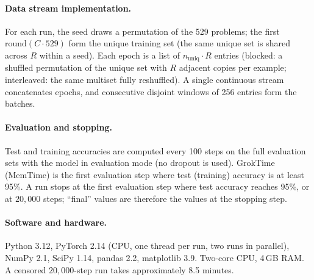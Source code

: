 \documentclass[10pt]{article}
\newcommand{\coverage}{C}
\newcommand{\groktime}{GrokTime}
\newcommand{\memtime}{MemTime}
\begin{document}
\paragraph{Data stream implementation.}
For each run, the seed draws a permutation of the 529 problems; the first $\mathrm{round}(\coverage \cdot 529)$ form the unique training set (the same unique set is shared across $R$ within a seed). Each epoch is a list of $n_{\mathrm{uniq}} \cdot R$ entries (blocked: a shuffled permutation of the unique set with $R$ adjacent copies per example; interleaved: the same multiset fully reshuffled). A single continuous stream concatenates epochs, and consecutive disjoint windows of 256 entries form the batches.

\paragraph{Evaluation and stopping.}
Test and training accuracies are computed every 100 steps on the full evaluation sets with the model in evaluation mode (no dropout is used). \groktime{} (\memtime{}) is the first evaluation step where test (training) accuracy is at least 95\%. A run stops at the first evaluation step where test accuracy reaches 95\%, or at $20{,}000$ steps; ``final'' values are therefore the values at the stopping step.

\paragraph{Software and hardware.}
Python 3.12, PyTorch 2.14 (CPU, one thread per run, two runs in parallel), NumPy 2.1, SciPy 1.14, pandas 2.2, matplotlib 3.9. Two-core CPU, 4\,GB RAM. A censored $20{,}000$-step run takes approximately 8.5 minutes.
\end{document}
